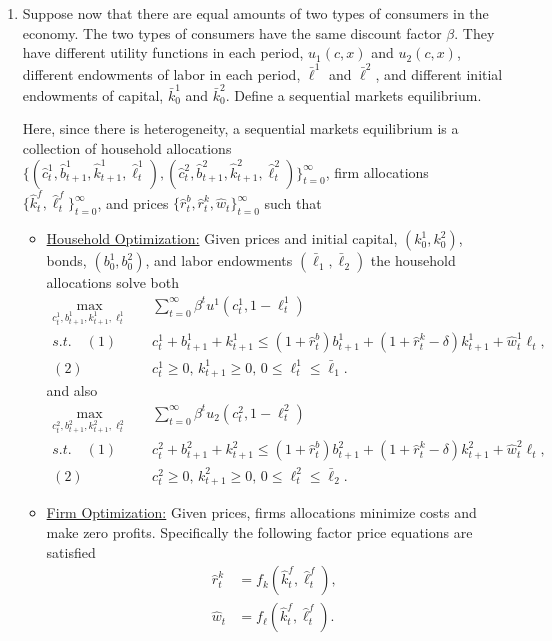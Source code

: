 \documentclass[11pt,english]{article}
\begin{document}
\begin{enumerate}
    \item[(d)] Suppose now that there are equal amounts of two types of consumers
        in the economy. The two types of consumers have the same discount factor
        $\beta$. They have different utility functions in each period,
        $u_1(c, x)$ and $u_2(c, x)$, different endowments of labor in each
        period, $\bar{\ell}^1$ and $\bar{\ell}^2$, and different initial
        endowments of capital, $\bar{k}_0^1$ and $\bar{k}_0^2$. Define a
        sequential markets equilibrium.
    \begin{solution}
 Here, since there is heterogeneity, a sequential markets equilibrium is a collection of household allocations $\{(\hat{c}_t^1, \hat{b}_{t+1}^1, \hat{k}_{t+1}^1, \hat{\ell}_t^1), (\hat{c}_t^2, \hat{b}_{t+1}^2, \hat{k}_{t+1}^2, \hat{\ell}_t^2)\}_{t=0}^\infty$, firm allocations $\{\hat{k}_t^f, \hat{\ell}_t^f\}_{t=0}^\infty$, and prices $\{\hat{r}^b_t, \hat{r}^k_t, \hat{w}_t\}_{t=0}^\infty$ such that 
\begin{itemize}
\item \underline{Household Optimization:} Given prices and initial capital, $(k_0^1, k_0^2)$, bonds, $(b_0^1, b_0^2)$, and labor endowments $(\bar{\ell}_1, \bar{\ell}_2)$ the household allocations solve both
\begin{align*}
\max_{c_t^1, b_{t+1}^1, k_{t+1}^1, \ell_t^1}&\quad \sum_{t=0}^\infty \beta^t u^1(c_t^1, 1 - \ell_t^1)\\
s.t.\quad (1)&\quad c_t^1 + b_{t+1}^1 + k_{t+1}^1 \leq (1 + \hat{r}^b_t)b_{t+1}^1 + (1 + \hat{r}^k_t - \delta)k_{t+1}^1 + \hat{w}_t^1\ell_t,\\
(2)&\quad c_t^1 \geq 0,\, k_{t+1}^1 \geq 0,\, 0 \leq \ell_t^1 \leq \bar{\ell}_1.
\end{align*}
and also
\begin{align*}
\max_{c_t^2, b_{t+1}^2, k_{t+1}^2, \ell_t^2}&\quad \sum_{t=0}^\infty \beta^t u_2(c_t^2, 1 - \ell_t^2)\\
s.t.\quad (1)&\quad c_t^2 + b_{t+1}^2 + k_{t+1}^2 \leq (1 + \hat{r}^b_t)b_{t+1}^2 + (1 + \hat{r}^k_t - \delta)k_{t+1}^2 + \hat{w}_t^2\ell_t,\\
(2)&\quad c_t^2 \geq 0,\, k_{t+1}^2 \geq 0,\, 0 \leq \ell_t^2 \leq \bar{\ell}_2.
\end{align*}
\item \underline{Firm Optimization:} Given prices, firms allocations minimize costs and make zero profits. Specifically the following factor price equations are satisfied
\begin{align*}
\hat{r}_t^k &= f_k\left(\hat{k}_t^f, \hat{\ell}_t^f\right),\\
\hat{w}_t &= f_\ell\left(\hat{k}_t^f, \hat{\ell}_t^f\right).
\end{align*}


\end{itemize}
\end{solution}
\end{enumerate}
\end{document}
